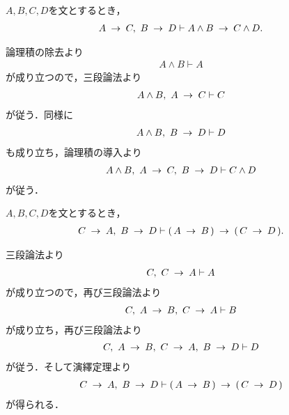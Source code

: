 	\begin{screen}
		\begin{logicalthm}[含意の論理積への遺伝性2]
		\label{logicalthm:heredity_of_implication_to_conjunction_2}
			$A,B,C,D$を文とするとき，
			\begin{align}
				A \rarrow C,\ B \rarrow D \vdash A \wedge B \rarrow C \wedge D.
			\end{align}
		\end{logicalthm}
	\end{screen}
	
	\begin{sketch}
		論理積の除去より
		\begin{align}
			A \wedge B \vdash A
		\end{align}
		が成り立つので，三段論法より
		\begin{align}
			A \wedge B,\ A \rarrow C \vdash C
		\end{align}
		が従う．同様に
		\begin{align}
			A \wedge B,\ B \rarrow D \vdash D
		\end{align}
		も成り立ち，論理積の導入より
		\begin{align}
			A \wedge B,\ A \rarrow C,\ B \rarrow D \vdash C \wedge D
		\end{align}
		が従う．
		\QED
	\end{sketch}
	
	\begin{screen}
		\begin{logicalthm}[含意の含意への遺伝性2]
		\label{logicalthm:heredity_of_implication_to_implication_2}
			$A,B,C,D$を文とするとき，
			\begin{align}
				C \rarrow A,\ B \rarrow D \vdash (\, A \rarrow B\, ) 
				\rarrow (\, C \rarrow D\, ).
			\end{align}
		\end{logicalthm}
	\end{screen}
	
	\begin{sketch}
		三段論法より
		\begin{align}
			C,\ C \rarrow A \vdash A
		\end{align}
		が成り立つので，再び三段論法より
		\begin{align}
			C,\ A \rarrow B,\ C \rarrow A \vdash B
		\end{align}
		が成り立ち，再び三段論法より
		\begin{align}
			C,\ A \rarrow B,\ C \rarrow A,\ B \rarrow D \vdash D
		\end{align}
		が従う．そして演繹定理より
		\begin{align}
			C \rarrow A,\ B \rarrow D \vdash 
			(\, A \rarrow B\, ) \rarrow (\, C \rarrow D\, )
		\end{align}
		が得られる．
		\QED
	\end{sketch}
	
